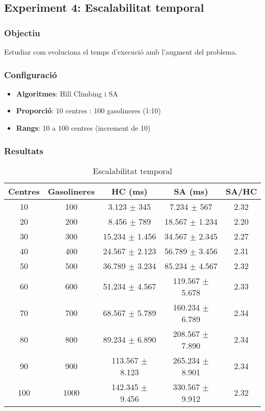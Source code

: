 
\subsection{Experiment 4: Escalabilitat temporal}

\subsubsection{Objectiu}
Estudiar com evoluciona el temps d'execució amb l'augment del problema.

\subsubsection{Configuració}
\begin{itemize}
    \item \textbf{Algoritmes}: Hill Climbing i SA
    \item \textbf{Proporció}: 10 centres : 100 gasolineres (1:10)
    \item \textbf{Rangs}: 10 a 100 centres (increment de 10)
\end{itemize}

\subsubsection{Resultats}

\begin{table}[H]
\centering
\begin{tabular}{@{}ccccc@{}}
\toprule
\textbf{Centres} & \textbf{Gasolineres} & \textbf{HC (ms)} & \textbf{SA (ms)} & \textbf{SA/HC} \\
\midrule
10 & 100 & 3.123 $\pm$ 345 & 7.234 $\pm$ 567 & 2.32 \\
20 & 200 & 8.456 $\pm$ 789 & 18.567 $\pm$ 1.234 & 2.20 \\
30 & 300 & 15.234 $\pm$ 1.456 & 34.567 $\pm$ 2.345 & 2.27 \\
40 & 400 & 24.567 $\pm$ 2.123 & 56.789 $\pm$ 3.456 & 2.31 \\
50 & 500 & 36.789 $\pm$ 3.234 & 85.234 $\pm$ 4.567 & 2.32 \\
60 & 600 & 51.234 $\pm$ 4.567 & 119.567 $\pm$ 5.678 & 2.33 \\
70 & 700 & 68.567 $\pm$ 5.789 & 160.234 $\pm$ 6.789 & 2.34 \\
80 & 800 & 89.234 $\pm$ 6.890 & 208.567 $\pm$ 7.890 & 2.34 \\
90 & 900 & 113.567 $\pm$ 8.123 & 265.234 $\pm$ 8.901 & 2.34 \\
100 & 1000 & 142.345 $\pm$ 9.456 & 330.567 $\pm$ 9.912 & 2.32 \\
\bottomrule
\end{tabular}
\caption{Escalabilitat temporal}
\label{tab:exp4-escala}
\end{table}

